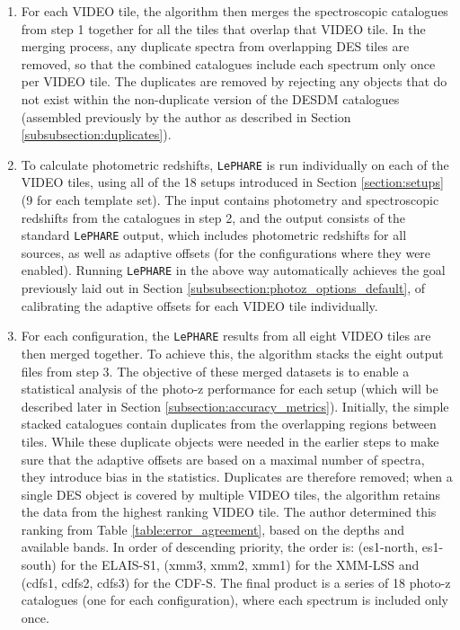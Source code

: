 \begin{enumerate}
    
    
    \item For each VIDEO tile, the algorithm then merges the spectroscopic catalogues from step 1 together for all the \DESVIDEO tiles that overlap that VIDEO tile. In the merging process, any duplicate spectra from overlapping DES tiles are removed, so that the combined catalogues include each spectrum only once per VIDEO tile. The duplicates are removed by rejecting any objects that do not exist within the non-duplicate version of the DESDM catalogues (assembled previously by the author as described in Section \ref{subsubsection:duplicates}). 
    
    \item To calculate photometric redshifts, \texttt{LePHARE} is run individually on each of the VIDEO tiles, using all of the 18 setups introduced in Section \ref{section:setups} (9 for each template set). The input contains photometry and spectroscopic redshifts from the catalogues in step 2, and the output consists of the standard \texttt{LePHARE} output, which includes photometric redshifts for all sources, as well as adaptive offsets (for the configurations where they were enabled).  Running \texttt{LePHARE} in the above way automatically achieves the goal previously laid out in Section \ref{subsubsection:photoz_options_default}, of calibrating the adaptive offsets for each VIDEO tile individually. 
    
    \item For each configuration, the \texttt{LePHARE} results from all eight VIDEO tiles are then merged together. To achieve this, the algorithm stacks the eight output files from step 3. The objective of these merged datasets is to enable a statistical analysis of the photo-z performance for each setup (which will be described later in Section \ref{subsection:accuracy_metrics}). Initially, the simple stacked catalogues contain duplicates from the overlapping regions between tiles. While these duplicate objects were needed in the earlier steps to make sure that the adaptive offsets are based on a maximal number of spectra, they introduce bias in the statistics. Duplicates are therefore removed; when a single DES object is covered by multiple VIDEO tiles, the algorithm retains the data from the highest ranking VIDEO tile. The author determined this ranking from Table \ref{table:error_agreement}, based on the depths and available bands. In order of descending priority, the order is: (es1-north, es1-south) for the ELAIS-S1, (xmm3, xmm2, xmm1) for the XMM-LSS and (cdfs1, cdfs2, cdfs3) for the CDF-S. The final product is a series of 18 photo-z catalogues (one for each configuration), where each spectrum is included only once. 
    
\end{enumerate}

